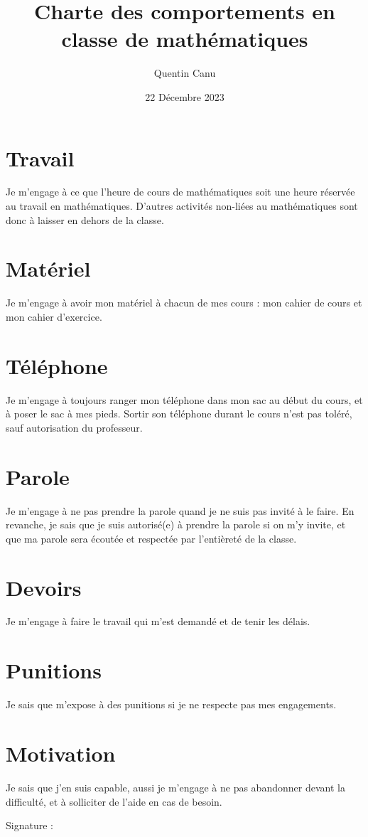 \documentclass{article}
\title{Charte des comportements en classe de mathématiques}
\date{22 Décembre 2023}
\author{Quentin Canu}
\begin{document}
\maketitle

\section{Travail}
Je m'engage à ce que l'heure de cours de mathématiques soit une heure réservée au travail en mathématiques. D'autres activités non-liées au mathématiques sont donc à laisser en dehors de la classe. 

\section{Matériel}
Je m'engage à avoir mon matériel à chacun de mes cours : mon cahier de cours et mon cahier d'exercice.

\section{Téléphone}
Je m'engage à toujours ranger mon téléphone dans mon sac au début du cours, et à poser le sac à mes pieds. Sortir son téléphone durant le cours n'est pas toléré, sauf autorisation du professeur.

\section{Parole}
Je m'engage à ne pas prendre la parole quand je ne suis pas invité à le faire. En revanche, je sais que je suis autorisé(e) à prendre la parole si on m'y invite, et que ma parole sera écoutée et respectée par l'entièreté de la classe.

\section{Devoirs}
Je m'engage à faire le travail qui m'est demandé et de tenir les délais.

\section{Punitions}
Je sais que m'expose à des punitions si je ne respecte pas mes engagements.

\section{Motivation}
Je sais que j'en suis capable, aussi je m'engage à ne pas abandonner devant la difficulté, et à solliciter de l'aide en cas de besoin.

\vspace*{0.5cm}

\begin{flushright}
Signature :
\end{flushright}
\end{document}

